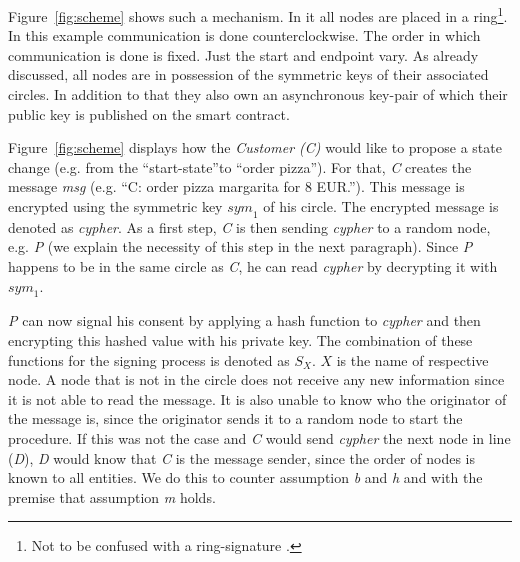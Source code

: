 \documentclass[runningheads]{llncs}
\newcommand{\comment}[1]{}
\newcommand{\ber}[1]{\textit{#1}}
\newcommand{\reffig}[1]{Figure~\ref{#1}}
\newcommand{\quotel}{``}
\newcommand{\quoter}{''}
\newcommand{\creditfootnote}[1]{}
\begin{document}
\reffig{fig:scheme} shows such a mechanism\creditfootnote{Credit: contract-icon in the \reffig{fig:scheme} made by Freepik (http://www.freepik.com) from www.flaticon.com}. In it all nodes are placed in a ring\footnote{Not to be confused with a ring-signature \cite{rivest2001leak}.}. In this example communication is done counterclockwise. The order in which communication is done is fixed. Just the start and endpoint vary. As already discussed, all nodes are in possession of the symmetric keys of their associated circles. In addition to that they also own an asynchronous key-pair of which their public key is published on the smart contract.

\reffig{fig:scheme} displays how the \ber{Customer (C)} would like to propose a state change (e.g. from the \quotel start-state\quoter  to \quotel order pizza\quoter ). For that, \ber{C} creates the message \ber{msg} (e.g. \quotel C: order pizza margarita for 8 EUR.\quoter ). This message is encrypted using the symmetric key ${sym}_1$ of his circle. The encrypted message is denoted as \ber{cypher}. As a first step, \ber{C} is then sending \ber{cypher} to a random node, e.g. \ber{P} (we explain the necessity of this step in the next paragraph). Since \ber{P} happens to be in the same circle as \ber{C}, he can read \ber{cypher} by decrypting it with ${sym}_1$. 



\ber{P} can now signal his consent by applying a hash function to \ber{cypher} and then encrypting this hashed value with his private key. The combination of these functions for the signing process is denoted as $S_X$. $X$ is the name of respective node. A node that is not in the circle does not receive any new information since it is not able to read the message. It is also unable to know who the originator of the message is, since the originator sends it to a random node to start the procedure. If this was not the case and \ber{C} would send \ber{cypher} the next node in line (\ber{D}), \ber{D} would know that \ber{C} is the message sender, since the order of nodes is known to all entities. We do this to counter assumption \ber{b} and \ber{h} and with the premise that assumption \ber{m} holds.

\comment{
Furthermore, a node will also not be able to know how many other nodes already \quotel agreed\quoter  to the message, because we \quotel nest\quoter  signatures instead of just appending them to a list. This way it is impossible to simply count the number of signatures, send together with \ber{cypher}. We do all of this to counter assumption \ber{b} and \ber{h} and with the premise that assumption \ber{m} holds.
}
\end{document}
